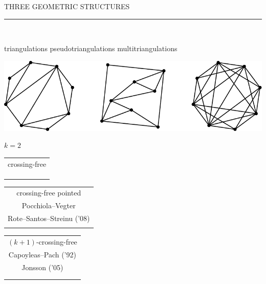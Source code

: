 \documentclass[12pt,titlepage,landscape,a4paper]{article}
\newcommand{\textemoyen}{\fontsize{23}{27}\selectfont}
\newenvironment{slide}[1]
{
\newpage
\begin{center}
{\blue \textemoyen \uppercase{#1}}\\
\end{center}
\vspace{-1cm}
\rule{\textwidth}{0.5 pt}\\
\vspace{-.8cm}
}
{\vspace*{-3cm}}
\newcommand{\violet}{\color{violet}} %
\newcommand{\blue}{\color{blue}} %
\newcommand{\papier}[1]{{\violet\fontsize{15}{20}\selectfont #1}} %
\begin{document}
\begin{slide}{Three geometric structures}

\hspace{1.6cm} triangulations \hspace{3.4cm} pseudotriangulations \hspace{2.5cm} multitriangulations\\
\begin{center}\includegraphics[scale=1.9]{geometricStructures0}\end{center}
\vspace{-1.08cm} \hspace*{25.7cm} ${k=2}$

\hspace{1.7cm} 
\begin{tabular}[t]{c} crossing-free \\ \\[-.3cm] \\ \\  \end{tabular} 
\hspace{3.4cm} 
\begin{tabular}[t]{c} crossing-free pointed \\ \papier{Pocchiola--Vegter} \\[-.3cm] \papier{Rote--Santos--Streinu ('08)} \\ \\  \end{tabular}
\hspace{2cm} 
\begin{tabular}[t]{c} $(k+1)$-crossing-free \\ \papier{Capoyleas--Pach ('92)} \\[-.3cm] \papier{Jonsson ('05)} \\ \\ \\  \end{tabular}

\end{slide}

\end{document}
